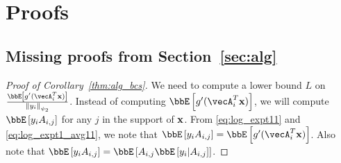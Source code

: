 \section{Proofs}\label{appendix:proofs}
\subsection{Missing proofs from Section~\ref{sec:alg}}\label{proof:sec:alg}
\begin{proof}[Proof of Corollary~\ref{thm:alg_bcs}]
We need to compute a lower bound $L$ on  $\frac{\bbE\insq{g'(\vecA_i^T\bx)}}{\normi{{y_i}}_{\psi_2}}$.  Instead of computing $\bbE\insq{g'(\vecA_i^T\bx)}$, we will compute $\bbE\insq{y_iA_{i,j}}$ for  any $j$ in the support of $\mathbf{x}$. From \eqref{eq:log_expt11} and \eqref{eq:log_expt1_avg11}, we note that $\bbE\insq{y_iA_{i,j}} = \bbE\insq{g'(\vecA_i^T\bx)}$.
Also note that
$\bbE\insq{y_i A_{i,j}}= \bbE\insq{ A_{i,j}\bbE\insq{y_i| A_{i,j}}}$.



\end{proof}

